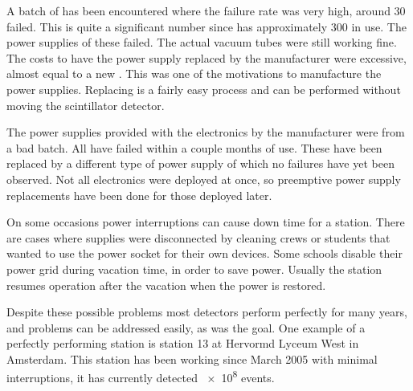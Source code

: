 A batch of \pmts has been encountered where the failure rate was very high, around 30 \pmts failed. This is quite a significant number since \hisparc has approximately 300 \pmts in use. The power supplies of these \pmts failed. The actual vacuum tubes were still working fine. The costs to have the power supply replaced by the manufacturer were excessive, almost equal to a new \pmt. This was one of the motivations to manufacture the \nikhef \pmt power supplies. Replacing \pmts is a fairly easy process and can be performed without moving the scintillator detector.

The power supplies provided with the \hisparc electronics by the manufacturer were from a bad batch. All have failed within a couple months of use. These have been replaced by a different type of power supply of which no failures have yet been observed. Not all electronics were deployed at once, so preemptive power supply replacements have been done for those deployed later.

On some occasions power interruptions can cause down time for a station.  There are cases where supplies were disconnected by cleaning crews or students that wanted to use the power socket for their own devices. Some schools disable their power grid during vacation time, in order to save power. Usually the station resumes operation after the vacation when the power is restored.

Despite these possible problems most detectors perform perfectly for many years, and problems can be addressed easily, as was the goal. One example of a perfectly performing station is station 13 at Hervormd Lyceum West in Amsterdam. This station has been working since March 2005 with minimal interruptions, it has currently detected \num{e8} events.

